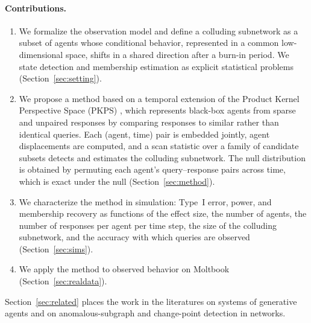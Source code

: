 \paragraph{Contributions.}
\begin{enumerate}
  \item We formalize the observation model and define a colluding subnetwork as a subset of agents whose conditional behavior, represented in a common low-dimensional space, shifts in a shared direction after a burn-in period. We state detection and membership estimation as explicit statistical problems (Section~\ref{sec:setting}).
  \item We propose a method based on a temporal extension of the Product Kernel Perspective Space (PKPS) \citep{pkps2026}, which represents black-box agents from sparse and unpaired responses by comparing responses to similar rather than identical queries. Each (agent, time) pair is embedded jointly, agent displacements are computed, and a scan statistic over a family of candidate subsets detects and estimates the colluding subnetwork. The null distribution is obtained by permuting each agent's query--response pairs across time, which is exact under the null (Section~\ref{sec:method}).
  \item We characterize the method in simulation: Type~I error, power, and membership recovery as functions of the effect size, the number of agents, the number of responses per agent per time step, the size of the colluding subnetwork, and the accuracy with which queries are observed (Section~\ref{sec:sims}).
  \item We apply the method to observed behavior on Moltbook (Section~\ref{sec:realdata}).
\end{enumerate}

Section~\ref{sec:related} places the work in the literatures on systems of generative agents and on anomalous-subgraph and change-point detection in networks.
